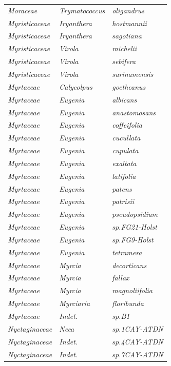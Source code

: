 \documentclass[fleqn,10pt]{ArtEcoFoG} %
\begin{document}
\begin{table}[t]
\begin{tabular}{lll}
\em{Moraceae} & \em{Trymatococcus} & \em{oligandrus}\\
\addlinespace
\em{Myristicaceae} & \em{Iryanthera} & \em{hostmannii}\\
\em{Myristicaceae} & \em{Iryanthera} & \em{sagotiana}\\
\em{Myristicaceae} & \em{Virola} & \em{michelii}\\
\em{Myristicaceae} & \em{Virola} & \em{sebifera}\\
\em{Myristicaceae} & \em{Virola} & \em{surinamensis}\\
\addlinespace
\em{Myrtaceae} & \em{Calycolpus} & \em{goetheanus}\\
\em{Myrtaceae} & \em{Eugenia} & \em{albicans}\\
\em{Myrtaceae} & \em{Eugenia} & \em{anastomosans}\\
\em{Myrtaceae} & \em{Eugenia} & \em{coffeifolia}\\
\em{Myrtaceae} & \em{Eugenia} & \em{cucullata}\\
\addlinespace
\em{Myrtaceae} & \em{Eugenia} & \em{cupulata}\\
\em{Myrtaceae} & \em{Eugenia} & \em{exaltata}\\
\em{Myrtaceae} & \em{Eugenia} & \em{latifolia}\\
\em{Myrtaceae} & \em{Eugenia} & \em{patens}\\
\em{Myrtaceae} & \em{Eugenia} & \em{patrisii}\\
\addlinespace
\em{Myrtaceae} & \em{Eugenia} & \em{pseudopsidium}\\
\em{Myrtaceae} & \em{Eugenia} & \em{sp.FG21-Holst}\\
\em{Myrtaceae} & \em{Eugenia} & \em{sp.FG9-Holst}\\
\em{Myrtaceae} & \em{Eugenia} & \em{tetramera}\\
\em{Myrtaceae} & \em{Myrcia} & \em{decorticans}\\
\addlinespace
\em{Myrtaceae} & \em{Myrcia} & \em{fallax}\\
\em{Myrtaceae} & \em{Myrcia} & \em{magnoliifolia}\\
\em{Myrtaceae} & \em{Myrciaria} & \em{floribunda}\\
\em{Myrtaceae} & \em{Indet.} & \em{sp.B1}\\
\em{Nyctaginaceae} & \em{Neea} & \em{sp.1CAY-ATDN}\\
\addlinespace
\em{Nyctaginaceae} & \em{Indet.} & \em{sp.4CAY-ATDN}\\
\em{Nyctaginaceae} & \em{Indet.} & \em{sp.7CAY-ATDN}\\

\end{tabular}
\end{table}
\end{document}
